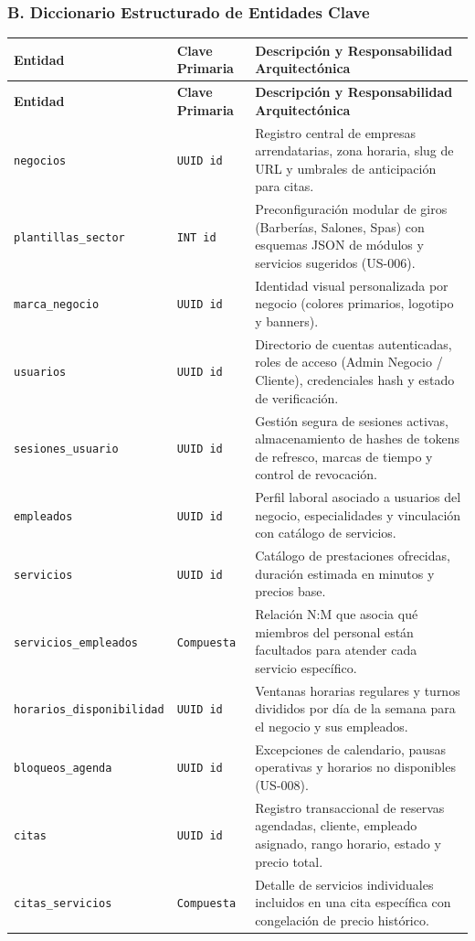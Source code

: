 \documentclass[11pt,letterpaper]{article}
\begin{document}
\subsubsection{B. Diccionario Estructurado de Entidades Clave}
\begin{longtable}{L{4.8cm} L{2.4cm} L{8.6cm}}
\toprule
\textbf{Entidad} & \textbf{Clave Primaria} & \textbf{Descripción y Responsabilidad Arquitectónica} \\
\midrule
\endfirsthead
\toprule
\textbf{Entidad} & \textbf{Clave Primaria} & \textbf{Descripción y Responsabilidad Arquitectónica} \\
\midrule
\endhead

\texttt{negocios} & \texttt{UUID id} & Registro central de empresas arrendatarias, zona horaria, slug de URL y umbrales de anticipación para citas. \\
\texttt{plantillas\_sector} & \texttt{INT id} & Preconfiguración modular de giros (Barberías, Salones, Spas) con esquemas JSON de módulos y servicios sugeridos (US-006). \\
\texttt{marca\_negocio} & \texttt{UUID id} & Identidad visual personalizada por negocio (colores primarios, logotipo y banners). \\
\texttt{usuarios} & \texttt{UUID id} & Directorio de cuentas autenticadas, roles de acceso (Admin Negocio / Cliente), credenciales hash y estado de verificación. \\
\texttt{sesiones\_usuario} & \texttt{UUID id} & Gestión segura de sesiones activas, almacenamiento de hashes de tokens de refresco, marcas de tiempo y control de revocación. \\
\texttt{empleados} & \texttt{UUID id} & Perfil laboral asociado a usuarios del negocio, especialidades y vinculación con catálogo de servicios. \\
\texttt{servicios} & \texttt{UUID id} & Catálogo de prestaciones ofrecidas, duración estimada en minutos y precios base. \\
\texttt{servicios\_empleados} & \texttt{Compuesta} & Relación N:M que asocia qué miembros del personal están facultados para atender cada servicio específico. \\
\texttt{horarios\_\allowbreak disponibilidad} & \texttt{UUID id} & Ventanas horarias regulares y turnos divididos por día de la semana para el negocio y sus empleados. \\
\texttt{bloqueos\_agenda} & \texttt{UUID id} & Excepciones de calendario, pausas operativas y horarios no disponibles (US-008). \\
\texttt{citas} & \texttt{UUID id} & Registro transaccional de reservas agendadas, cliente, empleado asignado, rango horario, estado y precio total. \\
\texttt{citas\_servicios} & \texttt{Compuesta} & Detalle de servicios individuales incluidos en una cita específica con congelación de precio histórico. \\
\bottomrule
\end{longtable}
\end{document}
